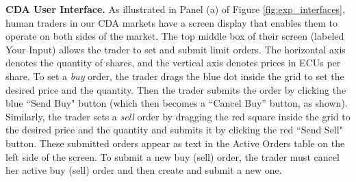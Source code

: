 \documentclass[12pt]{article}
\begin{document}


\bigskip
\noindent
\textbf{CDA User Interface.}
As illustrated 
in Panel (a) of Figure \ref{fig:exp_interfaces}, human traders in our CDA markets have a screen display that enables them to operate on both sides of the market.
The top middle box of their screen
(labeled Your Input) allows the trader to set and submit limit orders. The horizontal axis denotes the quantity of shares, and the vertical axis denotes prices in ECUs per share. To set a \textit{buy} order, the trader drags the blue dot inside the grid to set the desired price and the quantity. 
Then the trader submits the order by clicking the blue ``Send Buy" button (which then becomes a ``Cancel Buy'' button, as shown). 
Similarly, the trader sets a \textit{sell} order by dragging the red square inside the grid to the desired price and the quantity and submits it by clicking the red  ``Send Sell" button. 
These submitted orders appear as  text in the Active Orders table on the left side of the screen. 
To submit a new buy (sell) order, the trader must cancel her active buy (sell) order and then create and submit a new one. 
\end{document}

